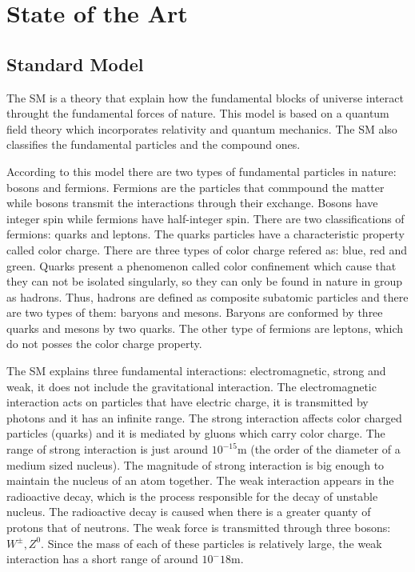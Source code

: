 \chapter{State of the Art} 

\section{Standard Model}


The SM is a theory that explain how the fundamental blocks of universe interact throught the fundamental forces of nature. This model is based on a quantum field theory which incorporates relativity and quantum mechanics. The SM also classifies the fundamental particles and the compound ones. 

According to this model there are two types of fundamental particles in nature: bosons and fermions. Fermions are the particles that commpound the matter while bosons transmit the interactions through their exchange. Bosons have integer spin while fermions have half-integer spin. There are two classifications of fermions: quarks and leptons. The quarks particles have a characteristic property called color charge. There are three types of color charge refered as: blue, red and green. Quarks present a phenomenon called color confinement which cause that they can not be isolated singularly, so they can only be found in nature in group as hadrons. Thus, hadrons are defined as composite subatomic particles and there are two types of them: baryons and mesons. Baryons are conformed by three quarks and mesons by two quarks. The other type of fermions are leptons, which do not posses the color charge property.

The SM explains three fundamental interactions: electromagnetic, strong and weak, it does not include the gravitational interaction. The electromagnetic interaction acts on particles that have electric charge, it is transmitted by photons and it has an infinite range. The strong interaction affects color charged particles (quarks) and it is mediated by gluons which carry color charge. The range of strong interaction is just around $10^{-15}$m (the order of the diameter of a medium sized nucleus). The magnitude of strong interaction is big enough to maintain the nucleus of an atom together. The weak interaction appears in the radioactive decay, which is the process responsible for the decay of unstable nucleus. The radioactive decay is caused when there is a greater quanty of protons that of neutrons. The weak force is transmitted through three bosons: $W^{\pm}, Z^0$. Since the mass of each of these particles is relatively large, the weak interaction has a short range of around $10^-18$m. 

